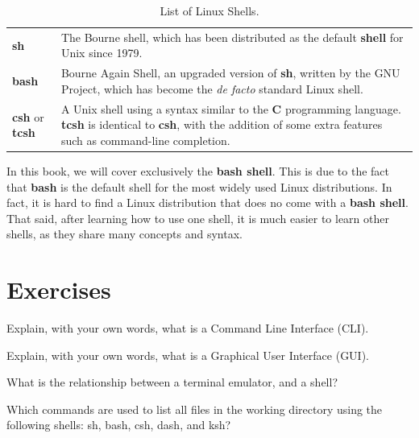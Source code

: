 \begin{table}[!htbp]
   \myfloatalign
   \begin{tabularx}{\textwidth}{Xp{90mm}} \toprule
   \textbf{sh} & The Bourne shell, which has been distributed as the default \textbf{shell} for Unix since 1979. \\
   \textbf{bash} & Bourne Again Shell, an upgraded version of \textbf{sh}, written by the GNU Project, which has become the \textit{de facto} standard Linux shell. \\
   \textbf{csh} or \textbf{tcsh} & A Unix shell using a syntax similar to the \textbf{C} programming language. \textbf{tcsh} is identical to \textbf{csh}, with the addition of some extra features such as command-line completion.\\
   \bottomrule
   \end{tabularx}
\caption{List of Linux Shells.}
\label{tab:ch1_shells}
\end{table}

In this book, we will cover exclusively the \textbf{bash shell}. This is due to the fact that \textbf{bash} is the default shell for the most widely used Linux distributions. In fact, it is hard to find a Linux distribution that does no come with a \textbf{bash shell}. That said, after learning how to use one shell, it is much easier to learn other shells, as they share many concepts and syntax.

\section*{Exercises}

\begin{exercises}
   \item Explain, with your own words, what is a Command Line Interface (\acs{CLI}).
   \item Explain, with your own words, what is a Graphical User Interface (\acs{GUI}).
   \item What is the relationship between a terminal emulator, and a shell?
   \item Which commands are used to list all files in the working directory using the following shells: sh, bash, csh, dash, and ksh?
\end{exercises}

